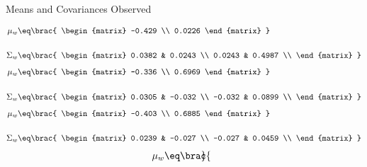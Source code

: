 \documentclass{article}
\begin{document}
\begin{question}

	\begin{qsection}{Means and Covariances Observed}

		\begin{enumerate}
			\ditem[N = 1]
				\begin{align*}
					\mu_w		&\eq	\brac{
						\begin{matrix}
							-0.429 \\
							0.0226
						\end{matrix}
					} \\\\
					\Sigma_w	&\eq	\brac{
						\begin{matrix}
							0.0382 &	0.0243	\\
							0.0243 &	0.4987	\\
						\end{matrix}
					}
				\end{align*}
			\ditem[N = 2]
				\begin{align*}
					\mu_w		&\eq	\brac{
						\begin{matrix}
							-0.336 \\
							0.6969
						\end{matrix}
					} \\\\
					\Sigma_w	&\eq	\brac{
						\begin{matrix}
							0.0305 &	-0.032	\\
							-0.032 &	0.0899	\\
						\end{matrix}
					}
				\end{align*}
			\ditem[N = 5]
				\begin{align*}
					\mu_w		&\eq	\brac{
						\begin{matrix}
							-0.403 \\
							0.6885
						\end{matrix}
					} \\\\
					\Sigma_w	&\eq	\brac{
						\begin{matrix}
							0.0239 &	-0.027	\\
							-0.027 &	0.0459	\\
						\end{matrix}
					}
				\end{align*}
			\ditem[N = 10]
				\begin{align*}
					\mu_w		&\eq	\brac{
						\begin{matrix}

\end{matrix}}
\end{align*}
\end{enumerate}
\end{qsection}
\end{question}
\end{document}
